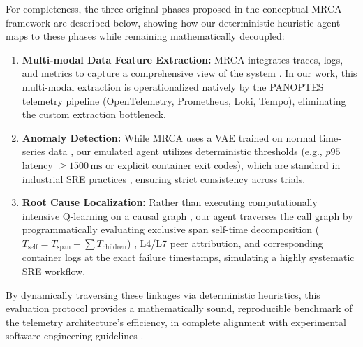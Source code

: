 For completeness, the three original phases proposed in the conceptual MRCA framework \cite{wang_2024} are described below, showing how our deterministic heuristic agent maps to these phases while remaining mathematically decoupled:

\begin{enumerate}
    \item \textbf{Multi-modal Data Feature Extraction:} MRCA integrates traces, logs, and metrics to capture a comprehensive view of the system \cite{wang_2024}. In our work, this multi-modal extraction is operationalized natively by the PANOPTES telemetry pipeline (OpenTelemetry, Prometheus, Loki, Tempo), eliminating the custom extraction bottleneck.

    \item \textbf{Anomaly Detection:} While MRCA uses a VAE trained on normal time-series data \cite{wang_2024}, our emulated agent utilizes deterministic thresholds (e.g., $p95$ latency $\ge 1500\,\text{ms}$ or explicit container exit codes), which are standard in industrial SRE practices \cite{beyer_2016}, ensuring strict consistency across trials.

    \item \textbf{Root Cause Localization:} Rather than executing computationally intensive Q-learning on a causal graph \cite{wang_2024}, our agent traverses the call graph by programmatically evaluating exclusive span self-time decomposition ($T_{\text{self}} = T_{\text{span}} - \sum T_{\text{children}}$) \cite{sigelman_2010}, L4/L7 peer attribution, and corresponding container logs at the exact failure timestamps, simulating a highly systematic SRE workflow.
\end{enumerate}

By dynamically traversing these linkages via deterministic heuristics, this evaluation protocol provides a mathematically sound, reproducible benchmark of the telemetry architecture's efficiency, in complete alignment with experimental software engineering guidelines \cite{wohlin_2012, sjoberg_2007}.